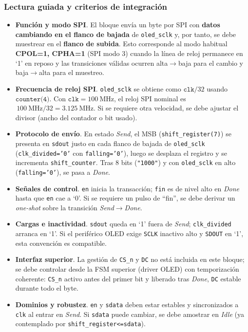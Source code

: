 \documentclass[a4paper,12pt]{article}
\begin{document}
\subsubsection*{Lectura guiada y criterios de integración}
\begin{itemize}
  \item \textbf{Función y modo SPI}. El bloque envía un byte por SPI con \textbf{datos cambiando en el flanco de bajada} de \texttt{oled\_sclk} y, por tanto, se debe muestrear en el \textbf{flanco de subida}. Esto corresponde al modo habitual \textbf{CPOL=1, CPHA=1} (SPI modo 3) cuando la línea de reloj permanece en ‘1’ en reposo y las transiciones válidas ocurren alta\(\to\)baja para el cambio y baja\(\to\)alta para el muestreo.
  \item \textbf{Frecuencia de reloj SPI}. \texttt{oled\_sclk} se obtiene como \(\texttt{clk}/32\) usando \(\texttt{counter(4)}\). Con \(\texttt{clk}=100~\text{MHz}\), el reloj SPI nominal es \(\,100~\text{MHz}/32 = 3.125~\text{MHz}\).  
        Si se requiere otra velocidad, se debe ajustar el divisor (ancho del contador o bit usado).
  \item \textbf{Protocolo de envío}. En estado \emph{Send}, el MSB (\texttt{shift\_register(7)}) se presenta en \texttt{sdout} justo en cada flanco de bajada de \texttt{oled\_sclk} (\texttt{clk\_divided='0'} con \texttt{falling='0'}), luego se desplaza el registro y se incrementa \texttt{shift\_counter}. Tras 8 bits (\texttt{"1000"}) y con \texttt{oled\_sclk} en alto (\texttt{falling='0'}), se pasa a \emph{Done}.
  \item \textbf{Señales de control}.  
        \texttt{en} inicia la transacción; \texttt{fin} es de nivel alto en \emph{Done} hasta que \texttt{en} cae a ‘0’. Si se requiere un pulso de “fin”, se debe derivar un \emph{one-shot} sobre la transición \emph{Send}\(\to\)\emph{Done}.
  \item \textbf{Cargas e inactividad}. \texttt{sdout} queda en ‘1’ fuera de \emph{Send}; \texttt{clk\_divided} arranca en ‘1’. Si el periférico OLED exige \texttt{SCLK} inactivo alto y \texttt{SDOUT} en ‘1’, esta convención es compatible.
  \item \textbf{Interfaz superior}. La gestión de \texttt{CS\_n} y \texttt{DC} no está incluida en este bloque; se debe controlar desde la FSM superior (driver OLED) con temporización coherente: \texttt{CS\_n} activo antes del primer bit y liberado tras \emph{Done}, \texttt{DC} estable durante todo el byte.
  \item \textbf{Dominios y robustez}. \texttt{en} y \texttt{sdata} deben estar estables y sincronizados a \texttt{clk} al entrar en \emph{Send}. Si \texttt{sdata} puede cambiar, se debe amostrar en \emph{Idle} (ya contemplado por \texttt{shift\_register<=sdata}).

\end{itemize}
\end{document}
